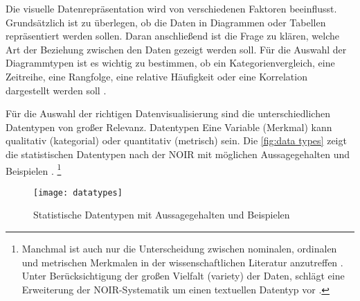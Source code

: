 
Die visuelle Datenrepräsentation wird von verschiedenen Faktoren beeinflusst.
Grundsätzlich ist zu überlegen, ob die Daten in Diagrammen oder Tabellen repräsentiert werden sollen.
Daran anschließend ist die Frage zu klären, welche Art der Beziehung zwischen den Daten gezeigt werden soll.
Für die Auswahl der Diagrammtypen ist es wichtig zu bestimmen, ob ein Kategorienvergleich, eine Zeitreihe, eine Rangfolge, 
eine relative Häufigkeit oder eine Korrelation dargestellt werden soll \cite[vgl.][137]{few_show_2012}.

Für die Auswahl der richtigen Datenvisualisierung sind die unterschiedlichen Datentypen von großer Relevanz.
Datentypen  \cite[99]{kirk_data_2019}  Eine Variable (Merkmal) kann qualitativ (kategorial) oder quantitativ (metrisch) sein.
Die \autoref{fig:data types} zeigt die statistischen Datentypen nach der \acrfull{NOIR} 
mit möglichen Aussagegehalten und Beispielen \cite[vgl.][12 ff.]{bortz_statistik_2010}.
\footnote{ Manchmal ist auch nur die Unterscheidung zwischen nominalen, ordinalen und metrischen
Merkmalen in der wissenschaftlichen Literatur anzutreffen \cite[vgl.][20]{cleff_deskriptive_2011}. 
Unter Berücksichtigung der großen Vielfalt (variety) der Daten, schlägt  
eine Erweiterung der \acrshort{NOIR}-Systematik um einen textuellen Datentyp vor \cite[vgl.][100]{kirk_data_2019}.}

 
 \begin{figure}[h]
    \centering
        \texttt{[image: datatypes]}
        \caption{Statistische Datentypen mit Aussagegehalten und Beispielen}
        \label{fig:data types}
\end{figure}


